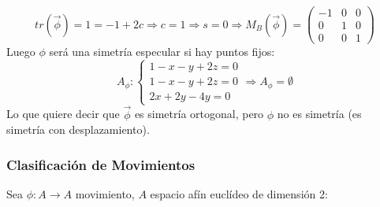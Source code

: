 \documentclass[10pt,a4paper,openright]{book}
\theoremstyle{break}
\begin{document}
$$tr(\vec{\phi}) = 1 = -1+2c\Rightarrow c = 1 \Rightarrow s = 0 \Rightarrow  M_B(\vec{\phi})=\begin{pmatrix} -1 & 0 & 0 \\ 0 & 1 & 0 \\ 0 & 0 & 1\end{pmatrix}$$
Luego $\phi$ será una simetría especular si hay puntos fijos:
$$A_\phi : \begin{cases} 1 - x - y + 2z = 0 \\ 1-x-y+2z = 0 \\ 2x + 2y - 4y = 0 \end{cases} \Rightarrow A_\phi = \emptyset$$
Lo que quiere decir que $\vec{\phi}$ es simetría ortogonal, pero $\phi$ no es simetría (es simetría con desplazamiento).

\subsubsection*{Clasificación de Movimientos}
Sea $\phi : A \to A $ movimiento, $A$ espacio afín euclídeo de dimensión 2:
\end{document}
